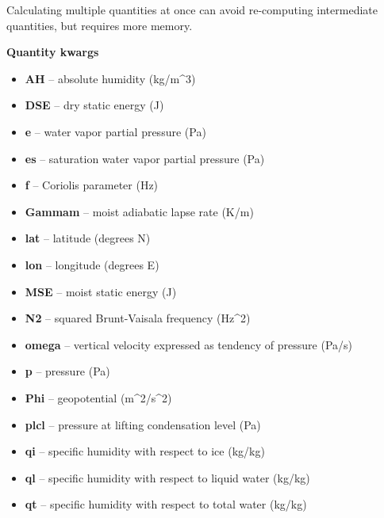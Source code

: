 \documentclass[letterpaper,10pt,english]{sphinxmanual}
\begin{document}
\begin{fulllineitems}
Calculating multiple quantities at once can avoid re-computing intermediate
quantities, but requires more memory.

\textbf{Quantity kwargs}
\begin{itemize}
\item {} 
\textbf{AH} -- absolute humidity (kg/m\textasciicircum{}3)

\item {} 
\textbf{DSE} -- dry static energy (J)

\item {} 
\textbf{e} -- water vapor partial pressure (Pa)

\item {} 
\textbf{es} -- saturation water vapor partial pressure (Pa)

\item {} 
\textbf{f} -- Coriolis parameter (Hz)

\item {} 
\textbf{Gammam} -- moist adiabatic lapse rate (K/m)

\item {} 
\textbf{lat} -- latitude (degrees N)

\item {} 
\textbf{lon} -- longitude (degrees E)

\item {} 
\textbf{MSE} -- moist static energy (J)

\item {} 
\textbf{N2} -- squared Brunt-Vaisala frequency (Hz\textasciicircum{}2)

\item {} 
\textbf{omega} -- vertical velocity expressed as tendency of pressure (Pa/s)

\item {} 
\textbf{p} -- pressure (Pa)

\item {} 
\textbf{Phi} -- geopotential (m\textasciicircum{}2/s\textasciicircum{}2)

\item {} 
\textbf{plcl} -- pressure at lifting condensation level (Pa)

\item {} 
\textbf{qi} -- specific humidity with respect to ice (kg/kg)

\item {} 
\textbf{ql} -- specific humidity with respect to liquid water (kg/kg)

\item {} 
\textbf{qt} -- specific humidity with respect to total water (kg/kg)


\end{itemize}
\end{fulllineitems}
\end{document}
